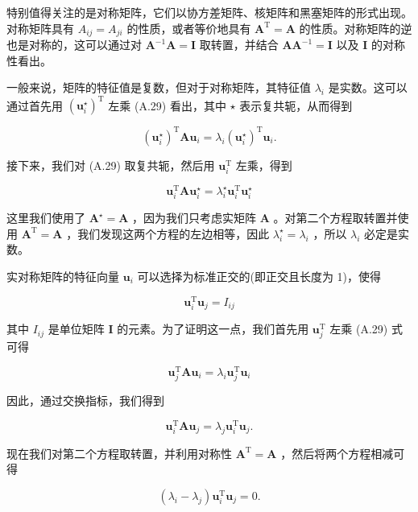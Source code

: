\documentclass[10pt]{report}
\begin{document}
特别值得关注的是对称矩阵，它们以协方差矩阵、核矩阵和黑塞矩阵的形式出现。对称矩阵具有 \({A}_{ij} = {A}_{ji}\) 的性质，或者等价地具有 \({\mathbf{A}}^{\mathrm{T}} = \mathbf{A}\) 的性质。对称矩阵的逆也是对称的，这可以通过对 \({\mathbf{A}}^{-1}\mathbf{A} = \mathbf{I}\) 取转置，并结合 \(\mathbf{A}{\mathbf{A}}^{-1} = \mathbf{I}\) 以及 \(\mathbf{I}\) 的对称性看出。

一般来说，矩阵的特征值是复数，但对于对称矩阵，其特征值 \({\lambda }_{i}\) 是实数。这可以通过首先用 \({\left( {\mathbf{u}}_{i}^{ \star  }\right) }^{\mathrm{T}}\) 左乘 (A.29) 看出，其中 \(\star\) 表示复共轭，从而得到

\[
{\left( {\mathbf{u}}_{i}^{ \star  }\right) }^{\mathrm{T}}\mathbf{A}{\mathbf{u}}_{i} = {\lambda }_{i}{\left( {\mathbf{u}}_{i}^{ \star  }\right) }^{\mathrm{T}}{\mathbf{u}}_{i}. \tag{A.31}
\]

接下来，我们对 (A.29) 取复共轭，然后用 \({\mathbf{u}}_{i}^{\mathrm{T}}\) 左乘，得到

\[
{\mathbf{u}}_{i}^{\mathrm{T}}\mathbf{A}{\mathbf{u}}_{i}^{ \star  } = {\lambda }_{i}^{ \star  }{\mathbf{u}}_{i}^{\mathrm{T}}{\mathbf{u}}_{i}^{ \star  } \tag{A.32}
\]

这里我们使用了 \({\mathbf{A}}^{ \star  } = \mathbf{A}\) ，因为我们只考虑实矩阵 \(\mathbf{A}\) 。对第二个方程取转置并使用 \({\mathbf{A}}^{\mathrm{T}} = \mathbf{A}\) ，我们发现这两个方程的左边相等，因此 \({\lambda }_{i}^{ \star  } = {\lambda }_{i}\) ，所以 \({\lambda }_{i}\) 必定是实数。

实对称矩阵的特征向量 \({\mathbf{u}}_{i}\) 可以选择为标准正交的(即正交且长度为 1)，使得

\[
{\mathbf{u}}_{i}^{\mathrm{T}}{\mathbf{u}}_{j} = {I}_{ij} \tag{A.33}
\]

其中 \({I}_{ij}\) 是单位矩阵 \(\mathbf{I}\) 的元素。为了证明这一点，我们首先用 \({\mathbf{u}}_{j}^{\mathrm{T}}\) 左乘 (A.29) 式可得

\[
{\mathbf{u}}_{j}^{\mathrm{T}}\mathbf{A}{\mathbf{u}}_{i} = {\lambda }_{i}{\mathbf{u}}_{j}^{\mathrm{T}}{\mathbf{u}}_{i} \tag{A.34}
\]

因此，通过交换指标，我们得到

\[
{\mathbf{u}}_{i}^{\mathrm{T}}\mathbf{A}{\mathbf{u}}_{j} = {\lambda }_{j}{\mathbf{u}}_{i}^{\mathrm{T}}{\mathbf{u}}_{j}. \tag{A.35}
\]

现在我们对第二个方程取转置，并利用对称性 \({\mathbf{A}}^{\mathrm{T}} = \mathbf{A}\) ，然后将两个方程相减可得

\[
\left( {{\lambda }_{i} - {\lambda }_{j}}\right) {\mathbf{u}}_{i}^{\mathrm{T}}{\mathbf{u}}_{j} = 0. \tag{A.36}
\]
\end{document}
